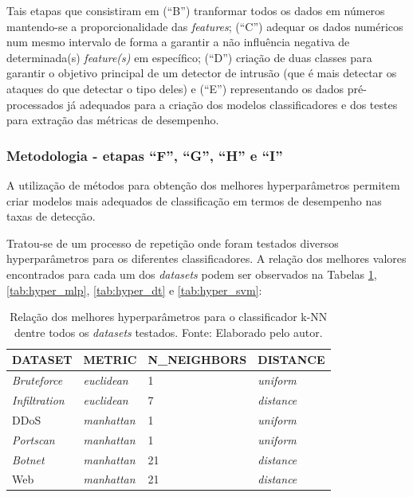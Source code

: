 Tais etapas que consistiram em (``B'') tranformar todos os dados em números mantendo-se a proporcionalidade das \textit{features}; (``C'') adequar os dados numéricos num mesmo intervalo de forma a garantir a não influência negativa de determinada(s) \textit{feature(s)} em específico; (``D'') criação de duas classes para garantir o objetivo principal de um detector de intrusão (que é mais detectar os ataques do que detectar o tipo deles) e (``E'') representando os dados pré-processados já adequados para a criação dos modelos classificadores e dos testes para extração das métricas de desempenho.

\subsubsection*{Metodologia - etapas ``F'', ``G'', ``H'' e ``I''}
\label{subsub_hyperp}
A utilização de métodos para obtenção dos melhores hyperparâmetros permitem criar modelos mais adequados de classificação em termos de desempenho nas taxas de detecção. 

Tratou-se de um processo de repetição onde foram testados diversos hyperparâmetros para os diferentes classificadores. A relação dos melhores valores encontrados para cada um dos \textit{datasets} podem ser observados na Tabelas \ref{tab:hyper_knn}, \ref{tab:hyper_mlp}, \ref{tab:hyper_dt} e \ref{tab:hyper_svm}:


\begin{longtable}{l|l|l|l}

\caption{Relação dos melhores hyperparâmetros para o classificador k-NN dentre todos os \textit{datasets} testados. Fonte: Elaborado pelo autor.}

\label{tab:hyper_knn}

\hline

\textbf{DATASET} & \textbf{METRIC} 		& \textbf{N\_NEIGHBORS} & \textbf{DISTANCE}        \\ \hline \hline
\textit{Bruteforce}   & \textit{euclidean} & 1  & \textit{uniform}  \\ \hline
\textit{Infiltration} & \textit{euclidean} & 7  & \textit{distance} \\ \hline
DDoS         & \textit{manhattan} & 1  & \textit{uniform}  \\ \hline
\textit{Portscan}     & \textit{manhattan} & 1  & \textit{uniform}  \\ \hline
\textit{Botnet}       & \textit{manhattan} & 21 & \textit{distance} \\ \hline
Web          & \textit{manhattan} & 21 & \textit{distance} \\ \hline

\end{longtable}












